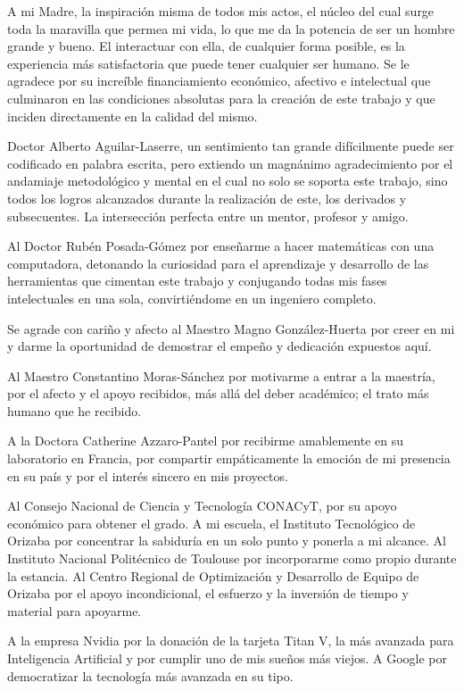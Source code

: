 \documentclass[12pt,oneside,letterpaper]{book}
\begin{document}
A mi Madre, la inspiración misma de todos mis actos, el núcleo del cual surge
toda la maravilla que permea mi vida, lo que me da la potencia de ser un hombre
grande y bueno. El interactuar con ella, de cualquier forma posible, es la
experiencia más satisfactoria que puede tener cualquier ser humano. Se le
agradece por su increíble financiamiento económico, afectivo e intelectual que
culminaron en las condiciones absolutas para la creación de este trabajo y que
inciden directamente en la calidad del mismo. 

Doctor Alberto Aguilar-Laserre, un sentimiento tan grande difícilmente puede ser
codificado en palabra escrita, pero extiendo un magnánimo agradecimiento por el
andamiaje metodológico y mental en el cual no solo se soporta este trabajo, sino
todos los logros alcanzados durante la realización de este, los derivados y
subsecuentes. La intersección perfecta entre un mentor, profesor y amigo.

Al Doctor Rubén Posada-Gómez por enseñarme a hacer matemáticas con una
computadora, detonando la curiosidad para el aprendizaje y desarrollo de las
herramientas que cimentan este trabajo y conjugando todas mis fases
intelectuales en una sola, convirtiéndome en un ingeniero completo.

Se agrade con cariño y afecto al Maestro Magno González-Huerta por creer en mi y
darme la oportunidad de demostrar el empeño y dedicación expuestos aquí. 

Al Maestro Constantino Moras-Sánchez por motivarme a entrar a la maestría, por
el afecto y el apoyo recibidos, más allá del deber académico; el trato más
humano que he recibido. 

A la Doctora Catherine Azzaro-Pantel por recibirme amablemente en su laboratorio
en Francia, por compartir empáticamente la emoción de mi presencia en su país y
por el interés sincero en mis proyectos.

Al Consejo Nacional de Ciencia y Tecnología CONACyT, por su apoyo económico para
obtener el grado. A mi escuela, el Instituto Tecnológico de Orizaba por
concentrar la sabiduría en un solo punto y ponerla a mi alcance. Al Instituto
Nacional Politécnico de Toulouse por incorporarme como propio durante la
estancia. Al  Centro Regional de Optimización y Desarrollo de Equipo de Orizaba
por el apoyo incondicional, el esfuerzo y la inversión de tiempo y material para
apoyarme.

A la empresa Nvidia por la donación de la tarjeta Titan V, la más avanzada para
Inteligencia Artificial y por cumplir uno de mis sueños más viejos. A Google por
democratizar la tecnología más avanzada en su tipo. 
\end{document}
